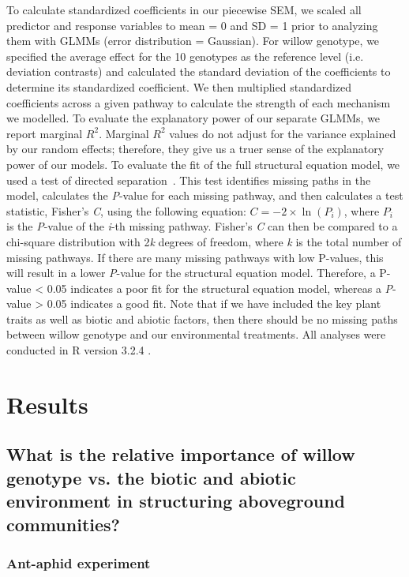 \documentclass[11pt]{article}
\begin{document}
To calculate standardized coefficients in our piecewise SEM, we scaled
all predictor and response variables to mean = 0 and SD = 1 prior to
analyzing them with GLMMs (error distribution = Gaussian). For willow
genotype, we specified the average effect for the 10 genotypes as the
reference level (i.e. deviation contrasts) and calculated the standard
deviation of the coefficients to determine its standardized coefficient.
We then multiplied standardized coefficients across a given pathway to
calculate the strength of each mechanism we modelled. To evaluate the
explanatory power of our separate GLMMs, we report marginal
\(R^2\)\cite{Nakagawa_2012}. Marginal \(R^2\) values do
not adjust for the variance explained by our random effects; therefore,
they give us a truer sense of the explanatory power of our models. To
evaluate the fit of the full structural equation model, we used a test
of directed separation~\cite{shipley2000new}. This test identifies missing
paths in the model, calculates the \emph{P}-value for each missing
pathway, and then calculates a test statistic, Fisher's \emph{C}, using
the following equation: \(C=-2\times\ln\left(P_i\right)\), where \(P_i\) is the
\emph{P}-value of the \emph{i}-th missing pathway. Fisher's \emph{C} can
then be compared to a chi-square distribution with 2\emph{k} degrees of
freedom, where \emph{k} is the total number of missing pathways. If
there are many missing pathways with low P-values, this will result in a
lower \emph{P}-value for the structural equation model. Therefore, a
P-value \textless{} 0.05 indicates a poor fit for the structural
equation model, whereas a \emph{P}-value \textgreater{} 0.05 indicates a
good fit. Note that if we have included the key plant traits as well as
biotic and abiotic factors, then there should be no missing paths
between willow genotype and our environmental treatments. All analyses
were conducted in R version 3.2.4 \cite{R2016}.
 

\section*{Results}

\subsection*{What is the relative importance of willow genotype vs. the biotic and
abiotic environment in structuring aboveground communities?}

\subsubsection*{Ant-aphid experiment}
\end{document}
